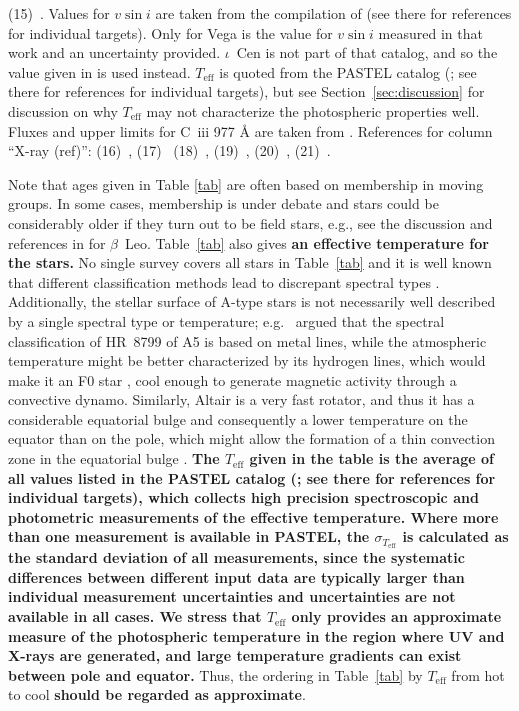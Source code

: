 \documentclass[linenumbers]{aastex631}
\begin{document}
\begin{table}
(15)~\citet{2009ApJ...701..209Z}. 
Values for $v \sin i$ are taken from the compilation of \citet{2002A&A...393..897R} (see there for references for individual targets). Only for Vega is the value for $v \sin i$ measured in that work and an uncertainty provided. $\iota$~Cen is not part of that catalog, and so the value given in \citet{2002ApJ...579..800S} is used instead. $T_\mathrm{eff}$ is quoted from the PASTEL catalog (\citealt{2016A&A...591A.118S}; see there for references for individual targets), but see Section~\ref{sec:discussion} for discussion on why  $T_\mathrm{eff}$ may not characterize the photospheric properties well. Fluxes and upper limits for C~{\sc iii} 977 \AA{} are taken from \citet{2002ApJ...579..800S}.
References for column ``X-ray (ref)'':
(16)~\citet{2014ApJ...786..136D},
(17)~\citet{2006ApJ...636..426P}
(18)~\citet{2012ApJ...750...78G},
(19)~\citet{2009A&A...497..511R},
(20)~\citet{2002ApJ...579..800S},
(21)~\citet{2010A&A...516A..38R}.
\end{table}


Note that ages given in Table \ref{tab} are often based on membership in moving groups. In some cases, membership is under debate and stars could be considerably older if they turn out to be field stars, e.g., see the discussion and references in \citet{2021AJ....161..186D} for $\beta$~Leo. Table~\ref{tab} also gives \textbf{an effective temperature for the stars.}
No single survey covers all stars in Table~\ref{tab} and it is well known that different classification methods lead to discrepant spectral types \citep[e.g.,][]{1989ApJS...70..623G}.
Additionally, the stellar surface of A-type stars is not necessarily well described by a single spectral type or temperature; e.g.\ \citet{2010A&A...516A..38R} argued that the
spectral classification of HR~8799 of A5 is based on metal lines,
while the atmospheric temperature might be better characterized by its
hydrogen lines, which would make it an F0 star
\citep{1999AJ....118.2993G}, cool enough to generate magnetic activity
through a convective dynamo. Similarly,  Altair is a very fast rotator, and thus it has a considerable equatorial bulge and consequently a lower temperature on the equator than on the pole, which might allow the formation of a thin convection zone in the equatorial bulge \citep{2009A&A...497..511R}. 
\textbf{The $T_\mathrm{eff}$ given in the table is the average of all values listed in the PASTEL catalog (\citealt{2016A&A...591A.118S}; see there for references for individual targets), which collects high precision spectroscopic and photometric measurements of the effective temperature. Where more than one measurement is available in PASTEL, the $\sigma_{T_\mathrm{eff}}$ is calculated as the standard deviation of all measurements, since the systematic differences between different input data are typically larger than individual measurement uncertainties and uncertainties are not available in all cases. We stress that $T_\mathrm{eff}$ only provides an approximate measure of the photospheric temperature in the region where UV and X-rays are generated, and large temperature gradients can exist between pole and equator.}
Thus, the ordering in Table~\ref{tab} by \textbf{$T_\mathrm{eff}$} from hot to cool \textbf{should be regarded as approximate}.
\end{document}
